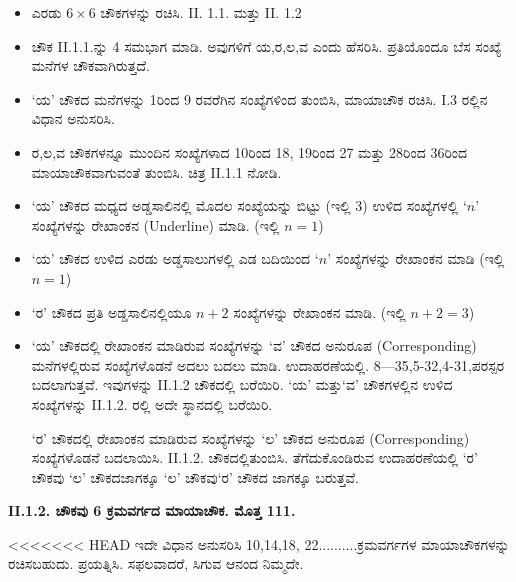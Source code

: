 \begin{itemize}
	\item ಎರಡು $6 \times 6$ ಚೌಕಗಳನ್ನು ರಚಿಸಿ. II. 1.1. ಮತ್ತು II. 1.2
	\item ಚೌಕ II.1.1.ನ್ನು 4 ಸಮಭಾಗ ಮಾಡಿ. ಅವುಗಳಿಗೆ ಯ,ರ,ಲ,ವ ಎಂದು ಹೆಸರಿಸಿ. ಪ್ರತಿಯೊಂದೂ ಬೆಸ ಸಂಖ್ಯೆ ಮನೆಗಳ ಚೌಕವಾಗಿರುತ್ತದೆ.
	\item ‘ಯ’ ಚೌಕದ ಮನೆಗಳನ್ನು 1ರಿಂದ 9 ರವರೆಗಿನ ಸಂಖ್ಯೆಗಳಿಂದ ತುಂಬಿಸಿ, ಮಾಯಾಚೌಕ ರಚಿಸಿ. I.3 ರಲ್ಲಿನ ವಿಧಾನ ಅನುಸರಿಸಿ.
	\item ರ,ಲ,ವ ಚೌಕಗಳನ್ನೂ ಮುಂದಿನ ಸಂಖ್ಯೆಗಳಾದ 10ರಿಂದ 18, 19ರಿಂದ 27 ಮತ್ತು 28ರಿಂದ 36ರಿಂದ ಮಾಯಾಚೌಕವಾಗುವಂತೆ ತುಂಬಿಸಿ. ಚಿತ್ರ II.1.1 ನೋಡಿ.
	\item ‘ಯ’ ಚೌಕದ ಮಧ್ಯದ ಅಡ್ಡಸಾಲಿನಲ್ಲಿ ಮೊದಲ ಸಂಖ್ಯೆಯನ್ನು ಬಿಟ್ಟು (ಇಲ್ಲಿ 3) ಉಳಿದ ಸಂಖ್ಯೆಗಳಲ್ಲಿ $‘n’$ ಸಂಖ್ಯೆಗಳನ್ನು ರೇಖಾಂಕನ (Underline) ಮಾಡಿ. (ಇಲ್ಲಿ $n=1$)
	\item ‘ಯ’ ಚೌಕದ ಉಳಿದ ಎರಡು ಅಡ್ಡಸಾಲುಗಳಲ್ಲಿ ಎಡ ಬದಿಯಿಂದ $‘n’$ ಸಂಖ್ಯೆ\-ಗಳನ್ನು ರೇಖಾಂಕನ ಮಾಡಿ (ಇಲ್ಲಿ $n=1$)
	\item ‘ರ’ ಚೌಕದ ಪ್ರತಿ ಅಡ್ಡಸಾಲಿನಲ್ಲಿಯೂ $n+2$ ಸಂಖ್ಯೆಗಳನ್ನು ರೇಖಾಂಕನ ಮಾಡಿ. (ಇಲ್ಲಿ $n+2=3$)
	\item ‘ಯ’ ಚೌಕದಲ್ಲಿ ರೇಖಾಂಕನ ಮಾಡಿರುವ ಸಂಖ್ಯೆಗಳನ್ನು ‘ವ’ ಚೌಕದ ಅನುರೂಪ (Corresponding) ಮನೆಗಳಲ್ಲಿರುವ ಸಂಖ್ಯೆಗಳೊಡನೆ ಅದಲು ಬದಲು ಮಾಡಿ. ಉದಾಹರಣೆಯಲ್ಲಿ. 8---35,5-32,4-31,ಪರಸ್ಪರ ಬದಲಾಗುತ್ತವೆ. ಇವುಗಳನ್ನು II.1.2 ಚೌಕದಲ್ಲಿ ಬರೆಯಿರಿ. ‘ಯ’ ಮತ್ತು‘ವ’ ಚೌಕಗಳಲ್ಲಿನ ಉಳಿದ ಸಂಖ್ಯೆಗಳನ್ನು II.1.2. ರಲ್ಲಿ ಅದೇ ಸ್ಥಾನದಲ್ಲಿ ಬರೆಯಿರಿ.

	‘ರ’ ಚೌಕದಲ್ಲಿ ರೇಖಾಂಕನ ಮಾಡಿರುವ ಸಂಖ್ಯೆಗಳನ್ನು ‘ಲ’ ಚೌಕದ ಅನುರೂಪ (Corresponding) ಸಂಖ್ಯೆಗಳೊಡನೆ ಬದಲಾಯಿಸಿ. II.1.2. ಚೌಕದಲ್ಲಿ\break ತುಂಬಿಸಿ. ತೆಗೆದುಕೊಂಡಿರುವ ಉದಾಹರಣೆಯಲ್ಲಿ ‘ರ’ ಚೌಕವು ‘ಲ’ ಚೌಕದ\break ಜಾಗಕ್ಕೂ ‘ಲ’ ಚೌಕವು‘ರ’ ಚೌಕದ ಜಾಗಕ್ಕೂ ಬರುತ್ತವೆ.
\end{itemize}

\textbf{II.1.2. ಚೌಕವು 6 ಕ್ರಮವರ್ಗದ ಮಾಯಾಚೌಕ. ಮೊತ್ತ 111.}

<<<<<<< HEAD
ಇದೇ ವಿಧಾನ ಅನುಸರಿಸಿ 10,14,18, 22..........ಕ್ರಮವರ್ಗಗಳ ಮಾಯಾಚೌಕಗಳನ್ನು ರಚಿಸಬಹುದು. ಪ್ರಯತ್ನಿಸಿ. ಸಫಲವಾದರೆ, ಸಿಗುವ ಆನಂದ ನಿಮ್ಮದೇ.

